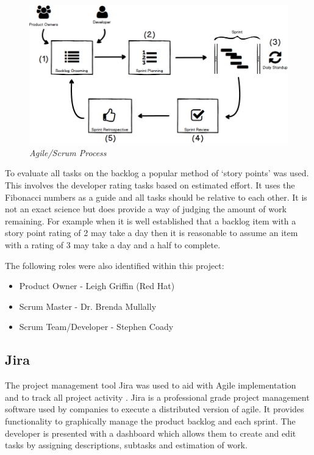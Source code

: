 \begin{figure}[!ht]
\centering
\includegraphics*[width=\textwidth]{images/scrum_process}
\caption{\em Agile/Scrum Process}
\label{fig:agile}
\end{figure}

To evaluate all tasks on the backlog a popular method of `story points' was used. This involves the developer rating tasks based on estimated effort. It uses the Fibonacci numbers as a guide and all tasks should be relative to each other. It is not an exact science but does provide a way of judging the amount of work remaining. For example when it is well established that a backlog item with a story point rating of 2 may take a day then it is reasonable to assume an item with a rating of 3 may take a day and a half to complete.

The following roles were also identified within this project:

\begin{itemize}
	\item Product Owner - Leigh Griffin (Red Hat)
	\item Scrum Master - Dr. Brenda Mullally
	\item Scrum Team/Developer - Stephen Coady
\end{itemize}

\subsection{Jira}
\label{sub:jira}
The project management tool Jira was used to aid with Agile implementation and to track all project activity \citep{JBoss2016}. Jira is a professional grade project management software used by companies to execute a distributed version of agile. It provides functionality to graphically manage the product backlog and each \gls{sprint}. The developer is presented with a dashboard which allows them to create and edit tasks by assigning descriptions, subtasks and estimation of work.

